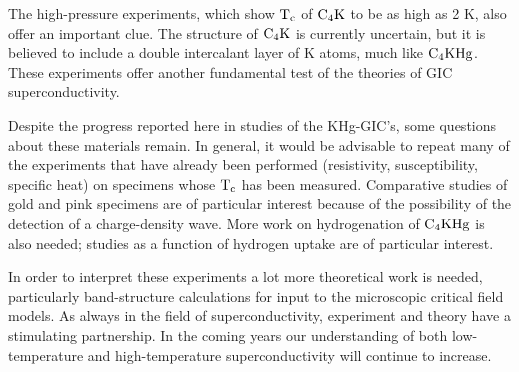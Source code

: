         The  high-pressure experiments, which show $\rm  T_c$ of $\rm C_4K$
to be as high  as  2 K,\cite{avdeev86}  also offer an  important clue.  The
structure  of  $\rm C_4K$ is currently  uncertain,   but it is  believed to
include   a   double intercalant  layer  of   K    atoms,  much  like  $\rm
C_4KHg$.\cite{avdeev87} These  experiments offer  another fundamental test of
the theories of GIC superconductivity.

        Despite the  progress reported here in   studies of  the KHg-GIC's,
some   questions about these materials  remain.   In   general, it would be
advisable  to  repeat  many of   the experiments  that have  already   been
performed  (resistivity, susceptibility, specific heat)  on specimens whose
$\rm T_c$   has been  measured.    Comparative  studies of   gold  and pink
specimens are  of  particular interest because  of the possibility  of  the
detection of a  charge-density  wave.   More work on  hydrogenation of $\rm
C_4KHg$ is  also needed;  studies as a function of  hydrogen uptake are  of
particular interest.
        
        In order to interpret these experiments a lot more theoretical work
is  needed, particularly  band-structure   calculations for  input  to  the
microscopic    critical field  models.     As  always   in  the  field   of
superconductivity, experiment and  theory have  a  stimulating partnership.
In  the coming  years   our   understanding of  both low-temperature    and
high-temperature superconductivity will continue to increase.
